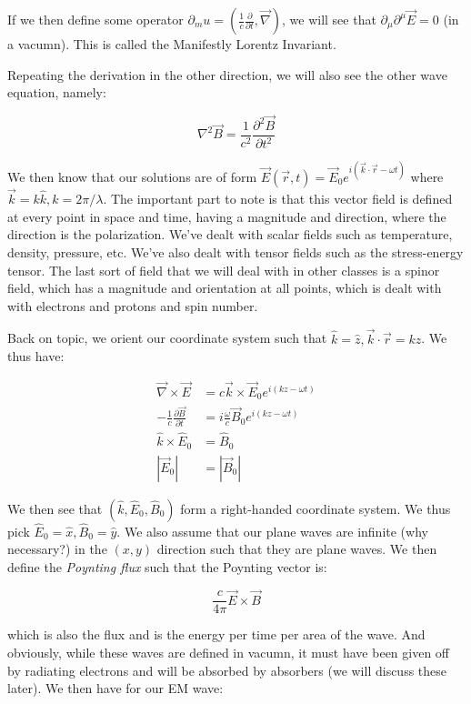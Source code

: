 \documentclass{report}
\begin{document}
If we then define some operator $\partial_mu = (\frac{1}{c}\frac{\partial}{\partial t}, \vec{\nabla})$, we will see that $\partial_\mu\partial^\mu\vec{E} = 0$ (in a vacumn). This is called the Manifestly Lorentz Invariant.

Repeating the derivation in the other direction, we will also see the other wave equation, namely:

$$\nabla^2\vec{B} = \frac{1}{c^2}\frac{\partial^2 \vec{B}}{\partial t^2}$$

We then know that our solutions are of form $\vec{E}(\vec{r},t) = \vec{E}_0 e^{i(\vec{k}\cdot\vec{r} - \omega t)}$ where $\vec{k} = k\hat{k}, k = 2\pi/\lambda$. The important part to note is that this vector field is defined at every point in space and time, having a magnitude and direction, where the direction is the polarization. We've dealt with scalar fields such as temperature, density, pressure, etc. We've also dealt with tensor fields such as the stress-energy tensor. The last sort of field that we will deal with in other classes is a spinor field, which has a magnitude and orientation at all points, which is dealt with with electrons and protons and spin number. 

Back on topic, we orient our coordinate system such that $\hat{k} = \hat{z}, \vec{k}\cdot\vec{r} = kz$. We thus have:

\begin{align*}
\vec{\nabla}\times \vec{E} &= c\vec{k} \times \vec{E}_0e^{i(kz - \omega t)}\\
-\frac{1}{c}\frac{\partial \vec{B}}{\partial t} &= i\frac{\omega}{c}\vec{B}_0e^{i(kz - \omega t)}\\
\hat{k} \times \hat{E}_0 &= \hat{B}_0\\
|\vec{E}_0| &= |\vec{B}_0|
\end{align*}

We then see that $(\hat{k}, \hat{E}_0, \hat{B}_0)$ form a right-handed coordinate system. We thus pick $\hat{E}_0 = \hat{x}, \hat{B}_0 = \hat{y}$. We also assume that our plane waves are infinite (why necessary?) in the $(x,y)$ direction such that they are plane waves. We then define the \emph{Poynting flux} such that the Poynting vector is:

$$\frac{c}{4\pi}\vec{E}\times\vec{B}$$

which is also the flux and is the energy per time per area of the wave. And obviously, while these waves are defined in vacumn, it must have been given off by radiating electrons and will be absorbed by absorbers (we will discuss these later). We then have for our EM wave:
\end{document}
